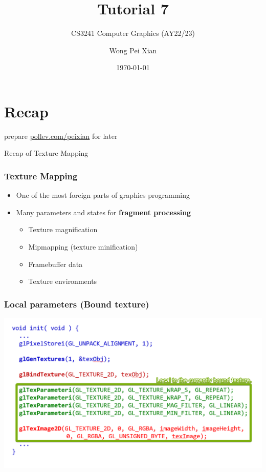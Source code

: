 \documentclass{beamer}
\title{Tutorial 7}
\subtitle{CS3241 Computer Graphics (AY22/23)}
\date{\today}
\author{Wong Pei Xian}
\institute[]{\email{e0389023@u.nus.edu}}
\begin{document}
\frame[plain]{\titlepage}

\section{Recap}

\begin{frame}
    prepare \url{pollev.com/peixian} for later
\end{frame}

\begin{frame}
    \AlegreyaExtraBold \LARGE
    Recap of Texture Mapping
\end{frame}

\begin{frame}
    \frametitle{Texture Mapping}

    \begin{itemize}
        \item One of the most foreign parts of graphics programming
        \item Many parameters and states for \textbf{fragment processing}
        \begin{itemize}
            \item Texture magnification
            \item Mipmapping (texture minification)
            \item Framebuffer data
            \item Texture environments
        \end{itemize}
    \end{itemize}

\end{frame}

\begin{frame}
    \frametitle{Local parameters (Bound texture)}

    \begin{center}
        \includegraphics[scale=0.5]{local-bound-texture.png}
    \end{center}

\end{frame}
\end{document}
